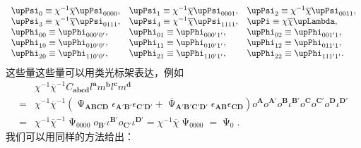 \begin{equation*}
	\begin{array}{ l l l }
		\upPsi _{0} \equiv \chi ^{-1}\overline{\chi } \upPsi _{0000} , & \upPsi _{1} \equiv \chi ^{-1}\overline{\chi } \upPsi _{0001} , & \upPsi _{2} \equiv \chi ^{-1}\overline{\chi } \upPsi _{0011} ,\\
		\upPsi _{3} \equiv \chi ^{-1}\overline{\chi } \upPsi _{0111} , & \upPsi _{4} \equiv \chi ^{-1}\overline{\chi } \upPsi _{1111} , & \upPi \equiv \chi \overline{\chi } \upLambda ,\\
		\upPhi _{00} \equiv \upPhi _{000'0'} , & \upPhi _{01} \equiv \upPhi _{000'1'} , & \upPhi _{02} \equiv \upPhi _{001'1} ,\\
		\upPhi _{10} \equiv \upPhi _{010'0'} , & \upPhi _{11} \equiv \upPhi _{010'1'} , & \upPhi _{12} \equiv \upPhi _{011'1} ,\\
		\upPhi _{20} \equiv \upPhi _{110'0'} , & \upPhi _{21} \equiv \upPhi _{110'1'} , & \upPhi _{22} \equiv \upPhi _{111'1'} .
	\end{array}
\end{equation*}
这些量这些量可以用类光标架表达，例如
\begin{equation*}
	\begin{aligned}
		& \chi ^{-1}\overline{\chi }^{-1} C_{\boldsymbol{abcd}} l^{\boldsymbol{a}} m^{\boldsymbol{b}} l^{\boldsymbol{c}} m^{\boldsymbol{d}}\\
		= & \chi ^{-1}\overline{\chi }^{-1} (\upPsi _{\boldsymbol{ABCD}} \epsilon _{\boldsymbol{A} '\boldsymbol{B} '} \epsilon _{\boldsymbol{C} '\boldsymbol{D} '} +\overline{\upPsi }_{\boldsymbol{A} '\boldsymbol{B} '\boldsymbol{C} '\boldsymbol{D} '} \epsilon _{\boldsymbol{AB}} \epsilon _{\boldsymbol{CD}} )o^{\boldsymbol{A}} o^{\boldsymbol{A} '} o^{\boldsymbol{B}} \iota ^{\boldsymbol{B} '} o^{\boldsymbol{C}} o^{\boldsymbol{C} '} o^{\boldsymbol{D}} \iota ^{\boldsymbol{D} '}\\
		= & \chi ^{-1}\overline{\chi }^{-1} \upPsi _{0000} o_{\boldsymbol{B} '} \iota ^{\boldsymbol{B} '} o_{\boldsymbol{C} '} \iota ^{\boldsymbol{D} '} =\chi ^{-1}\overline{\chi } \upPsi _{0000} =\upPsi _{0} .
	\end{aligned}
\end{equation*}
我们可以用同样的方法给出：
